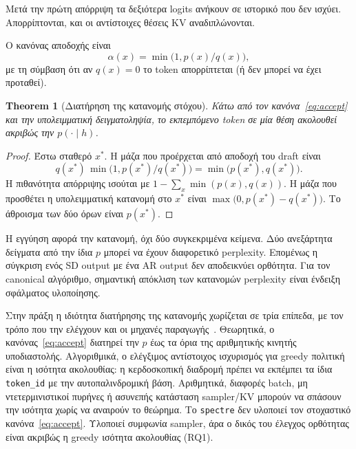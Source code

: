 \documentclass[a4paper,12pt]{report}
\theoremstyle{plain}
\newtheorem{theorem}{Theorem}[chapter]
\theoremstyle{definition}
\theoremstyle{remark}
\begin{document}
Μετά την πρώτη απόρριψη τα δεξιότερα logits ανήκουν σε ιστορικό που δεν
ισχύει. Απορρίπτονται, και οι αντίστοιχες θέσεις KV αναδιπλώνονται.

Ο κανόνας αποδοχής είναι
\begin{equation}
  \alpha(x)=\min\bigl(1,p(x)/q(x)\bigr),
  \label{eq:accept}
\end{equation}
με τη σύμβαση ότι αν \(q(x)=0\) το token απορρίπτεται (ή δεν μπορεί να έχει
προταθεί).

\begin{theorem}[Διατήρηση της κατανομής στόχου]
  \label{thm:lossless}
  Κάτω από τον κανόνα~\eqref{eq:accept} και την υπολειμματική δειγματοληψία,
  το εκπεμπόμενο token σε μία θέση ακολουθεί ακριβώς την \(p(\cdot\mid h)\).
\end{theorem}

\begin{proof}
  Έστω σταθερό \(x^{\ast}\). Η μάζα που προέρχεται από αποδοχή του draft είναι
  \[
    q(x^{\ast})\,\min\bigl(1,p(x^{\ast})/q(x^{\ast})\bigr)
    =\min\bigl(p(x^{\ast}),q(x^{\ast})\bigr).
  \]
  Η πιθανότητα απόρριψης ισούται με \(1-\sum_{x}\min(p(x),q(x))\). Η μάζα που
  προσθέτει η υπολειμματική κατανομή στο \(x^{\ast}\) είναι
  \(\max\bigl(0,p(x^{\ast})-q(x^{\ast})\bigr)\). Το άθροισμα των δύο όρων είναι
  \(p(x^{\ast})\).
\end{proof}

Η εγγύηση αφορά την κατανομή, όχι δύο συγκεκριμένα κείμενα. Δύο ανεξάρτητα
δείγματα από την ίδια \(p\) μπορεί να έχουν διαφορετικό perplexity. Επομένως
η σύγκριση ενός SD output με ένα AR output δεν αποδεικνύει ορθότητα. Για τον
canonical αλγόριθμο, σημαντική απόκλιση των κατανομών perplexity είναι ένδειξη
σφάλματος υλοποίησης.

Στην πράξη η ιδιότητα διατήρησης της κατανομής χωρίζεται σε τρία
επίπεδα, με τον τρόπο που την
ελέγχουν και οι μηχανές παραγωγής~\cite{vllm-speculative-docs}. Θεωρητικά, ο
κανόνας~\eqref{eq:accept} διατηρεί την \(p\) έως τα όρια της αριθμητικής
κινητής υποδιαστολής. Αλγοριθμικά, ο ελέγξιμος αντίστοιχος ισχυρισμός για
greedy πολιτική είναι η ισότητα ακολουθίας: η κερδοσκοπική διαδρομή πρέπει να
εκπέμπει τα ίδια \texttt{token\_id} με την αυτοπαλινδρομική βάση. Αριθμητικά,
διαφορές batch, μη ντετερμινιστικοί πυρήνες ή ασυνεπής κατάσταση sampler/KV
μπορούν να σπάσουν την ισότητα χωρίς να αναιρούν το θεώρημα. Το
\texttt{spectre} δεν υλοποιεί τον στοχαστικό κανόνα~\eqref{eq:accept}. Υλοποιεί
συμφωνία sampler, άρα ο δικός του έλεγχος ορθότητας είναι ακριβώς η greedy
ισότητα ακολουθίας (RQ1).
\end{document}
